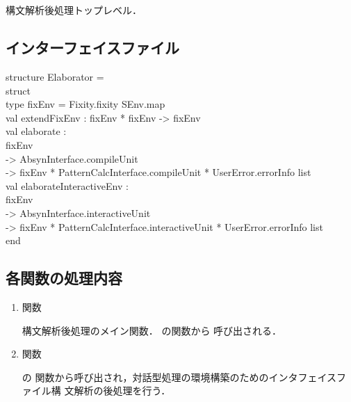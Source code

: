 \section{}
\ifjp%
	構文解析後処理トップレベル．
\subsection{インターフェイスファイル}
\begin{program}
structure Elaborator =\\
struct\\
\myem   type fixEnv = Fixity.fixity SEnv.map\\
\myem   val extendFixEnv : fixEnv * fixEnv -> fixEnv\\
\myem   val elaborate :\\
\myem \myem       fixEnv\\
\myem \myem       -> AbsynInterface.compileUnit\\
\myem \myem       -> fixEnv * PatternCalcInterface.compileUnit * UserError.errorInfo list\\
\myem   val elaborateInteractiveEnv :\\
\myem \myem       fixEnv\\
\myem \myem       -> AbsynInterface.interactiveUnit\\
\myem \myem       -> fixEnv * PatternCalcInterface.interactiveUnit * UserError.errorInfo list\\
end
\end{program}

\subsection{各関数の処理内容}
\begin{enumerate}
\item {}関数

	構文解析後処理のメイン関数．
	の関数から
呼び出される．

\item {}関数

	の
関数から呼び出され，対話型処理の環境構築のためのインタフェイスファイル構
文解析の後処理を行う．

\end{enumerate}
\else%
\fi%

